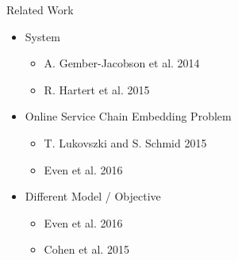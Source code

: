 \begin{frame}[<+->]{Related Work}

\begin{itemize}
  \item System
  	\begin{itemize}
    	\item A. Gember-Jacobson et al. 2014
    	\item R. Hartert et al. 2015
	\end{itemize}
  
  \item Online Service Chain Embedding Problem
  	\begin{itemize}
		\item T. Lukovszki and S. Schmid 2015 
		\item Even et al. 2016
	\end{itemize}
	
  \item Different Model / Objective
  	\begin{itemize}
    	\item Even et al. 2016
    	\item Cohen et al. 2015
	\end{itemize} 
\end{itemize}
\end{frame}